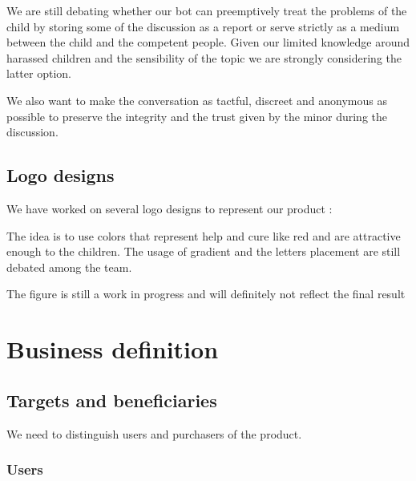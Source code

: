 \documentclass{article}
\begin{document}
We are still debating whether our bot can preemptively treat the problems of the child by storing some of the discussion as a report or serve strictly as a medium between the child and the competent people. Given our limited knowledge around harassed children and the sensibility of the topic we are strongly considering the latter option.

\medskip

We also want to make the conversation as tactful, discreet and anonymous as possible to preserve the integrity and the trust given by the minor during the discussion.

\subsection{Logo designs}

We have worked on several logo designs to represent our product :

\begin{figure}[ht]
\centering
{}

\end{figure} 

The idea is to use colors that represent help and cure like red  and are attractive enough to the children. The usage of gradient and the letters placement are still debated among the team.

\medskip

The figure is still a work in progress and will definitely not reflect the final result


\newpage

\section{Business definition}

\subsection{Targets and beneficiaries}

We need to distinguish users and purchasers of the product.


\subsubsection{Users}
\end{document}
